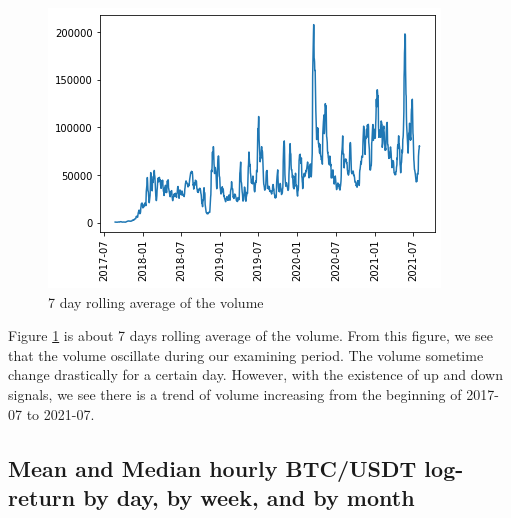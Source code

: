 \documentclass[twoside]{report}
\begin{document}
\begin{spacing}{1}
\begin{figure}[!htbp]
    \centering
    \includegraphics[scale = 0.5]{Images/Volume Rolling Average.png}
    \caption{7 day rolling average of the volume}
    \label{7day rolling volume}
\end{figure}

Figure \ref{7day rolling volume} is about 7 days rolling average of the volume. From this figure, we see that the volume oscillate during our examining period. The volume sometime change drastically for a certain day. However, with the existence of up and down signals, we see there is a trend of volume increasing from the beginning of 2017-07 to 2021-07.


\subsection{Mean and Median hourly BTC/USDT log-return by day, by week, and by month}


\end{spacing}
\end{document}
